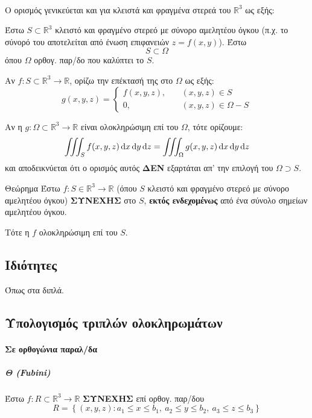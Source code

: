\documentclass[11pt,a4paper,titlepage,draft]{article}
\begin{document}
\paragraph{}

Ο ορισμός γενικεύεται και για κλειστά και φραγμένα στερεά του \( \mathbb R ^3\) ως εξής:

Έστω \(S \subset  \mathbb R ^3 \) κλειστό και φραγμένο στερεό με σύνορο αμελητέου όγκου (π.χ. το σύνορό του αποτελείται από ένωση επιφανειών \(z=f(x,y)\)). Έστω
\[
S \subset \Omega
\]
όπου \(\Omega\) ορθογ. παρ/δο που καλύπτει το \(S\).

Αν $f:S \subset \mathbb R^3 \to  \mathbb R $, ορίζω την επέκτασή της στο \(\Omega\) ως εξής:
\[
g(x,y,z) = \begin{cases}
f(x,y,z),\quad&(x,y,z)\in S\\
0,\quad&(x,y,z)\in \Omega-S
\end{cases}
\]

Αν η \(g:\Omega \subset  \mathbb R ^3\to \mathbb R \) είναι ολοκληρώσιμη επί του \(\Omega\), τότε ορίζουμε:
\[
\iiint_S f(x,y,z)\dif x\dif y\dif z=
\iiint_\Omega g(x,y,z)\dif x\dif y \dif z
\]
και αποδεικνύεται ότι ο ορισμός αυτός \textbf{ΔΕΝ} εξαρτάται απ' την επιλογή του \(\Omega \supset S\).

\begin{attnbox}{Θεώρημα}
Έστω \(f:S\in  \mathbb R ^3\to  \mathbb R \) (όπου $S$ κλειστό και φραγμένο στερεό με σύνορο αμελητέου όγκου) \textbf{ΣΥΝΕΧΗΣ} στο \(S\), \textbf{εκτός ενδεχομένως} από ένα σύνολο σημείων αμελητέου όγκου.

Τότε η \(f\) ολοκληρώσιμη επί του \(S\).
\end{attnbox}

\subsection{Ιδιότητες}
Όπως στα διπλά.

\subsection{Υπολογισμός τριπλών ολοκληρωμάτων}
\paragraph{ Σε ορθογώνια παραλ/δα}
\subparagraph{Θ (\textlatin{Fubini})} Έστω \(f:R \subset  \mathbb R ^3\to  \mathbb R \) \textbf{ΣΥΝΕΧΗΣ} επί ορθογ. παρ/δου
\[
R =  \left\lbrace (x,y,z): a_1\leq x\leq b_1,\ a_2\leq y\leq b_2,\ a_3\leq z\leq b_3  \right\rbrace
\]
\end{document}
